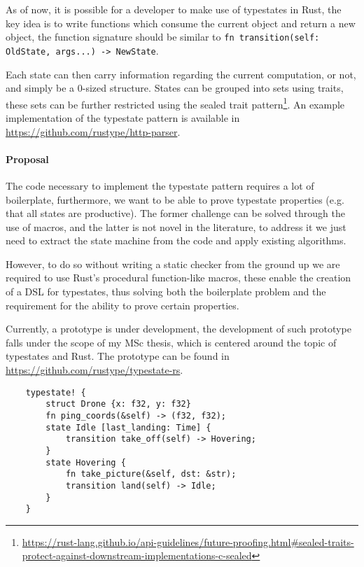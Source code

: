 \documentclass{article}
\begin{document}
As of now, it is possible for a developer to make use of typestates in Rust,
the key idea is to write functions which consume the current object and return a new object,
the function signature should be similar to \texttt{fn transition(self: OldState, args...) -> NewState}.

Each state can then carry information regarding the current computation, or not, and simply be a 0-sized structure.
States can be grouped into sets using traits,
these sets can be further restricted using the sealed trait pattern\footnote{\url{https://rust-lang.github.io/api-guidelines/future-proofing.html\#sealed-traits-protect-against-downstream-implementations-c-sealed}}.
An example implementation of the typestate pattern is available in \url{https://github.com/rustype/http-parser}.


\paragraph{Proposal}

The code necessary to implement the typestate pattern requires a lot of boilerplate,
furthermore, we want to be able to prove typestate properties (e.g. that all states are productive).
The former challenge can be solved through the use of macros,
and the latter is not novel in the literature,
to address it we just need to extract the state machine from the code and apply existing algorithms.

However, to do so without writing a static checker from the ground up we are required to use Rust's procedural function-like macros, these enable the creation of a DSL for typestates, thus solving both the boilerplate problem and the requirement for the ability to prove certain properties.

Currently, a prototype is under development, the development of such prototype falls under the scope of my MSc thesis, which is centered around the topic of typestates and Rust.
The prototype can be found in \url{https://github.com/rustype/typestate-rs}.

\begin{verbatim}
    typestate! {
        struct Drone {x: f32, y: f32}
        fn ping_coords(&self) -> (f32, f32);
        state Idle [last_landing: Time] {
            transition take_off(self) -> Hovering;
        }
        state Hovering {
            fn take_picture(&self, dst: &str);
            transition land(self) -> Idle;
        }
    }
\end{verbatim}
\end{document}
